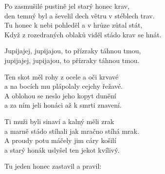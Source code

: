 
\ve{}
Po zasmušilé pustině jel starý honec krav,\\
den temný byl a ševelil dech větru v stéblech trav.\\
Tu honec k nebi pohleděl a v hrůze zůtal stát,\\
Když z rozedraných oblaků viděl stádo krav se hnát.

\cho{}
Jupijajej, jupijajou, to přízraky táhnou tmou,\\
jupijajej, jupijajou, to přízraky táhnou tmou.

\ve{}
Ten skot měl rohy z ocele a oči krvavé\\
a na bocích mu plápolaly cejchy řežavé.\\
A oblohou se neslo jeho kopyt dunění\\
a za ním jeli honáci až k smrti znavení.

\cho{}

\ve{}
Ti muži byli sinaví a kalný měli zrak\\
a marně stádo stíhali jak mračno stíhá mrak.\\
A proudy potu máčely jim cáry košilí\\
a starý honák uslyšel ten jekot kvílivý.

\cho{}

\ve{}
Tu jeden honec zastavil a pravil: 

\cho{}
\esong
